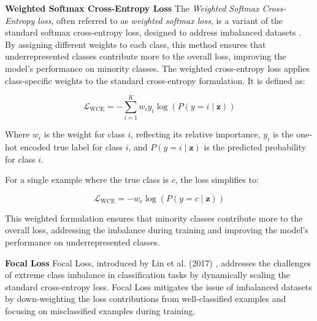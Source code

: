 \myindent \textbf{Weighted Softmax Cross-Entropy Loss}
The \textit{Weighted Softmax Cross-Entropy loss}, often referred to as \textit{weighted softmax loss}, is a variant of the standard softmax cross-entropy loss, designed to address imbalanced datasets \cite{pytorch_crossentropy} \cite{lin2018focallossdenseobject}. By assigning different weights to each class, this method ensures that underrepresented classes contribute more to the overall loss, improving the model's performance on minority classes. The weighted cross-entropy loss applies class-specific weights to the standard cross-entropy formulation. It is defined as:

\begin{equation}
    \mathcal{L}_{\text{WCE}} = -\sum_{i=1}^{K} w_i y_i \log(P(y = i \mid \mathbf{z}))
\end{equation}

Where \( w_i \) is the weight for class \( i \), reflecting its relative importance, \( y_i \) is the one-hot encoded true label for class \( i \), and \( P(y = i \mid \mathbf{z}) \) is the predicted probability for class \( i \).

For a single example where the true class is \( c \), the loss simplifies to:

\begin{equation}
    \mathcal{L}_{\text{WCE}} = -w_c \log(P(y = c \mid \mathbf{z}))
\end{equation}

This weighted formulation ensures that minority classes contribute more to the overall loss, addressing the imbalance during training and improving the model's performance on underrepresented classes.

\myindent \textbf{Focal Loss}
Focal Loss, introduced by Lin et al. (2017) \cite{lin2018focallossdenseobject}, addresses the challenges of extreme class imbalance in classification tasks by dynamically scaling the standard cross-entropy loss. Focal Loss mitigates the issue of imbalanced datasets by down-weighting the loss contributions from well-classified examples and focusing on misclassified examples during training.



